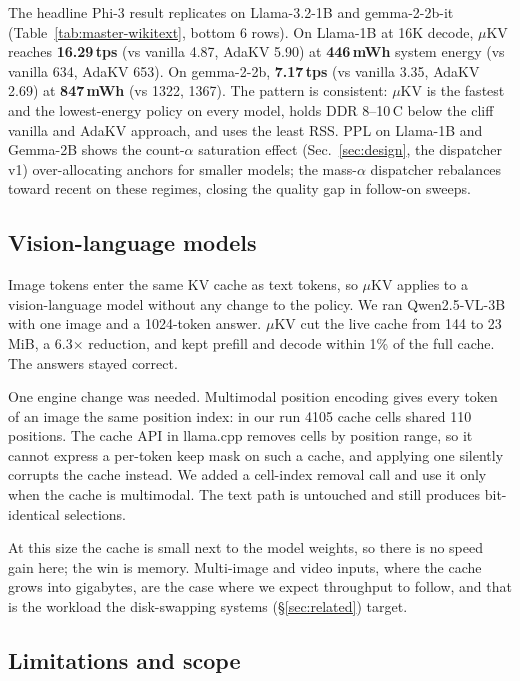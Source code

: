 \documentclass[sigconf, anonymous=false, screen=true]{acmart}
\newcommand{\good}[1]{\textcolor{kvgreen}{\textbf{#1}}}
\begin{document}
The headline Phi-3 result replicates on Llama-3.2-1B and gemma-2-2b-it (Table~\ref{tab:master-wikitext}, bottom 6 rows). On Llama-1B at 16K decode, $\mu$KV reaches \good{16.29\,tps} (vs vanilla 4.87, AdaKV 5.90) at \good{446\,mWh} system energy (vs vanilla 634, AdaKV 653). On gemma-2-2b, \good{7.17\,tps} (vs vanilla 3.35, AdaKV 2.69) at \good{847\,mWh} (vs 1322, 1367). The pattern is consistent: $\mu$KV is the fastest and the lowest-energy policy on every model, holds DDR 8--10\,\textdegree C below the cliff vanilla and AdaKV approach, and uses the least RSS. PPL on Llama-1B and Gemma-2B shows the count-$\alpha$ saturation effect (Sec.~\ref{sec:design}, the dispatcher v1) over-allocating anchors for smaller models; the mass-$\alpha$ dispatcher rebalances toward recent on these regimes, closing the quality gap in follow-on sweeps.

\subsection{Vision-language models}
\label{sec:vlm}

Image tokens enter the same KV cache as text tokens, so $\mu$KV applies to a
vision-language model without any change to the policy. We ran Qwen2.5-VL-3B with one
image and a 1024-token answer. $\mu$KV cut the live cache from 144 to 23\,MiB, a
6.3$\times$ reduction, and kept prefill and decode within 1\% of the full cache. The
answers stayed correct.

One engine change was needed. Multimodal position encoding gives every token of an image
the same position index: in our run 4105 cache cells shared 110 positions. The cache API
in llama.cpp removes cells by position range, so it cannot express a per-token keep mask
on such a cache, and applying one silently corrupts the cache instead. We added a
cell-index removal call and use it only when the cache is multimodal. The text path is
untouched and still produces bit-identical selections.

At this size the cache is small next to the model weights, so there is no speed gain here;
the win is memory. Multi-image and video inputs, where the cache grows into gigabytes,
are the case where we expect throughput to follow, and that is the workload the
disk-swapping systems (\S\ref{sec:related}) target.

\subsection{Limitations and scope}
\label{sec:limitations}
\end{document}
